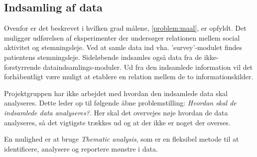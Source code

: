 \subsection{Indsamling af data}
Ovenfor er det beskrevet i hvilken grad målene, \cref{problem:maal}, er opfyldt.
Det muliggør udførelsen af eksperimenter der undersøger relationen mellem social aktivitet og stemningsleje.
Ved at samle data ind vha. 'survey'-modulet findes patientens stemningsleje.
Sideløbende indsamles også data fra de ikke-forstyrrende dataindsamlings-moduler.
Ud fra den indsamlede information vil det forhåbentligt være muligt at etablere en relation mellem de to informationskilder.

Projektgruppen har ikke arbejdet med hvordan den indsamlede data skal analyseres.
Dette leder op til følgende åbne problemstilling: \textit{Hvordan skal de indsamlede data analyseres?}.
Her skal det overvejes nøje hvordan de data analyseres, så det vigtigste trækkes ud og at der ikke er noget der overses.

En mulighed er at bruge \textit{Thematic analysis}\cite{thematic}, som er en fleksibel metode til at identificere, analysere og reportere mønstre i data.
